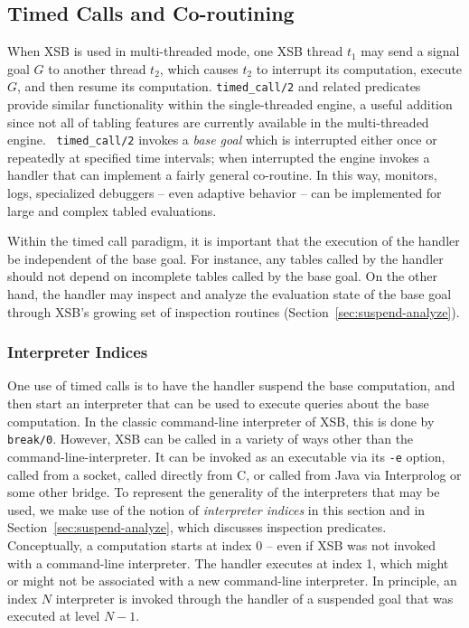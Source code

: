 
\subsection{Timed Calls and Co-routining} \label{sec:timed-call}
When XSB is used in multi-threaded mode, one XSB thread $t_1$ may send
a signal goal $G$ to another thread $t_2$, which causes $t_2$ to
interrupt its computation, execute $G$, and then resume its
computation.
{\tt timed\_call/2} and
related predicates provide similar functionality within the
single-threaded engine, a useful addition since not all of tabling
features are currently available in the multi-threaded engine.  {\tt
  timed\_call/2} invokes a {\em base goal} which is interrupted either
once or repeatedly at specified time intervals; when interrupted the
engine invokes a handler that can implement a fairly general
co-routine.  In this way, monitors, logs, specialized debuggers --
even adaptive behavior -- can be implemented for large and complex
tabled evaluations.

Within the timed call paradigm, it is important that the execution of
the handler be independent of the base goal.  For instance, any tables
called by the handler should not depend on incomplete tables called by
the base goal.  On the other hand, the handler may inspect and analyze
the evaluation state of the base goal through XSB's growing set of
inspection routines (Section~\ref{sec:suspend-analyze}).

\subsubsection{Interpreter Indices}
%
One use of timed calls is to have the handler suspend the base
computation, and then start an interpreter that can be used to execute
queries about the base computation.  In the classic command-line
interpreter of XSB, this is done by {\tt break/0}.  However, XSB can
be called in a variety of ways other than the
command-line-interpreter.  It can be invoked as an executable via its
{\tt -e} option, called from a socket, called directly from C, or
called from Java via Interprolog or some other bridge.  To represent
the generality of the interpreters that may be used, we make use of
the notion of {\em interpreter indices} in this section and in
Section~\ref{sec:suspend-analyze}, which discusses inspection
predicates.  Conceptually, a computation starts at index 0 -- even if
XSB was not invoked with a command-line interpreter.  The handler
executes at index 1, which might or might not be associated with a new
command-line interpreter.  In principle, an index $N$ interpreter is
invoked through the handler of a suspended goal that was executed at
level $N-1$.


